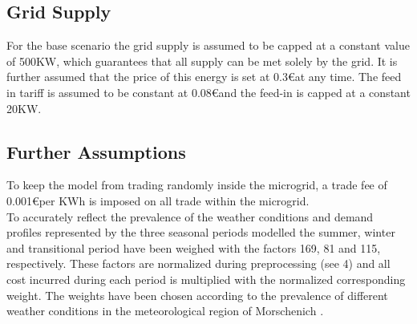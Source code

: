 \documentclass[
	11pt,								%
	DIV10,								%
	a4paper,         					%
	oneside,							%
	headheight=20pt,					%
	footheight=20pt,					%
    parskip=full,						%
    listof=totoc,						%
	bibliography=totoc,					%
	index=totoc,						%
]{scrartcl}
\begin{document}
\subsection{Grid Supply}
For the base scenario the grid supply is assumed to be capped at a constant value of 500KW, which guarantees that all supply can be met solely by the grid. It is further assumed that the price of this energy is set at 0.3\euro at any time. The feed in tariff is assumed to be constant at 0.08\euro and the feed-in is capped at a constant 20KW. 

\subsection{Further Assumptions}
To keep the model from trading randomly inside the microgrid, a trade fee of 0.001\euro per KWh is imposed on all trade within the microgrid.\\
To accurately reflect the prevalence of the weather conditions and demand profiles represented by the three seasonal periods modelled the summer, winter and transitional period have been weighed with the factors 169, 81 and 115, respectively. These factors are normalized during preprocessing (see 4) and all cost incurred during each period is multiplied with the normalized corresponding weight. The weights have been chosen according to the prevalence of different weather conditions in the meteorological region of Morschenich \cite{vereindeutscheringenieureReferenzlastprofileUndMehrfamilien2008}.
\end{document}
